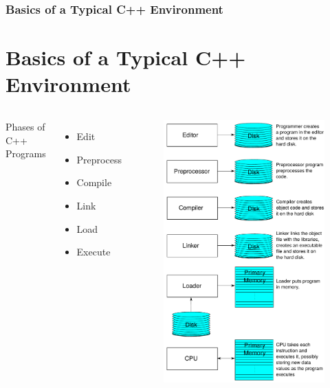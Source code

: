 \documentclass{beamer}
\begin{document}
\begin{frame}
    \frametitle{Basics of a Typical C++ Environment}
    \section{Basics of a Typical C++ Environment} %
    \label{sec:environment_basics}
    \begin{columns}
        Phases of C++ Programs
        \begin{itemize}
            \item Edit
            \item Preprocess
            \item Compile
            \item Link
            \item Load
            \item Execute
        \end{itemize}
            \begin{figure}
                \centering
                \includegraphics[scale=0.2]{6phases.pdf}
            \end{figure}
    \end{columns}
\end{frame}
\end{document}
